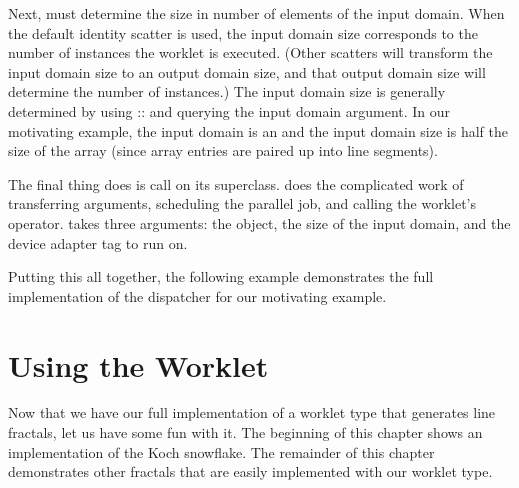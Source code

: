 
Next,  must determine the size in number of elements of the input domain.
When the default identity scatter is used, the input domain size corresponds to the number of instances the worklet is executed.
(Other scatters will transform the input domain size to an output domain size, and that output domain size will determine the number of instances.)
The input domain size is generally determined by using :: and querying the input domain argument.
In our motivating example, the input domain is an  and the input domain size is half the size of the array (since array entries are paired up into line segments).

The final thing  does is call  on its  superclass.
 does the complicated work of transferring arguments, scheduling the parallel job, and calling the worklet's operator.
 takes three arguments: the  object, the size of the input domain, and the device adapter tag to run on.


Putting this all together, the following example demonstrates the full implementation of the dispatcher for our motivating example.




\section{Using the Worklet}
\label{sec:NewWorkletTypes:Using}

Now that we have our full implementation of a worklet type that generates line fractals, let us have some fun with it.
The beginning of this chapter shows an implementation of the Koch snowflake.
The remainder of this chapter demonstrates other fractals that are easily implemented with our worklet type.

\subsection{}


